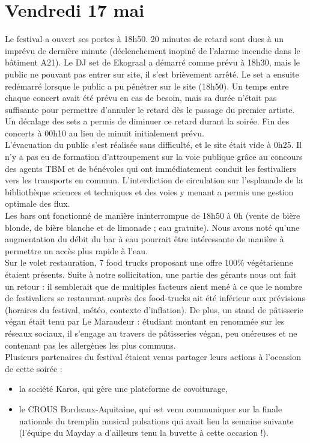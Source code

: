 \documentclass[12pt,a4paper]{report}
\begin{document}
\section{Vendredi 17 mai}

Le festival a ouvert ses portes à 18h50. 20 minutes de retard sont dues à un imprévu de dernière minute (déclenchement inopiné de l'alarme incendie dans le bâtiment A21). Le DJ set de Ekograal a démarré comme prévu à 18h30, mais le public ne pouvant pas entrer sur site, il s'est brièvement arrêté. Le set a ensuite redémarré lorsque le public a pu pénétrer sur le site (18h50). Un temps entre chaque concert avait été prévu en cas de besoin, mais sa durée n'était pas suffisante pour permettre d'annuler le retard dès le passage du premier artiste. Un décalage des sets a permis de diminuer ce retard durant la soirée. Fin des concerts à 00h10 au lieu de minuit initialement prévu.\\

L'évacuation du public s'est réalisée sans difficulté, et le site était vide à 0h25. Il n'y a pas eu de formation d'attroupement sur la voie publique grâce au concours des agents TBM et de bénévoles qui ont immédiatement conduit les festivaliers vers les transports en commun. L'interdiction de circulation sur l'esplanade de la bibliothèque sciences et techniques et des voies y menant a permis une gestion optimale des flux.\\

Les bars ont fonctionné de manière ininterrompue de 18h50 à 0h (vente de bière blonde, de bière blanche et de limonade ; eau gratuite). Nous avons noté qu'une augmentation du débit du bar à eau pourrait être intéressante de manière à permettre un accès plus rapide à l'eau.\\

Sur le volet restauration, 7 food trucks proposant une offre 100\% végétarienne étaient présents. Suite à notre sollicitation, une partie des gérants nous ont fait un retour : il semblerait que de multiples facteurs aient mené à ce que le nombre de festivaliers se restaurant auprès des food-trucks ait été inférieur aux prévisions (horaires du festival, météo, contexte d'inflation). De plus, un stand de pâtisserie végan était tenu par Le Maraudeur : étudiant montant en renommée sur les réseaux sociaux, il s'engage au travers de pâtisseries végan, peu onéreuses et ne contenant pas les allergènes les plus communs.\\

Plusieurs partenaires du festival étaient venus partager leurs actions à l'occasion de cette soirée : 
\begin{itemize}
\item la société Karos, qui gère une plateforme de covoiturage,
\item le CROUS Bordeaux-Aquitaine, qui est venu communiquer sur la finale nationale du tremplin musical pulsations qui avait lieu la semaine suivante (l'équipe du Mayday a d'ailleurs tenu la buvette à cette occasion !).\\
\end{itemize}
\end{document}
